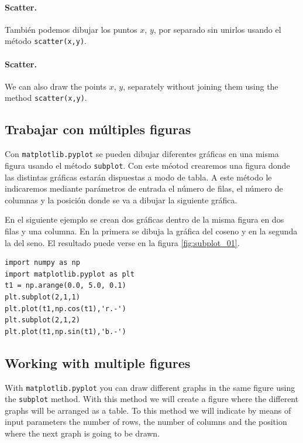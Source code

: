 \begin{paracol}{2}
    \paragraph{Scatter.} También podemos dibujar los puntos $x$, $y$, por separado sin unirlos usando el método \texttt{scatter(x,y)}. 
    \switchcolumn
    \paragraph{Scatter.} We can also draw the points $x$, $y$, separately without joining them using the method \texttt{scatter(x,y)}. 
\end{paracol}

\begin{paracol}{2}
\subsection{Trabajar con múltiples figuras}
Con \texttt{matplotlib.pyplot} se pueden dibujar diferentes gráficas en una misma figura usando el método \texttt{subplot}. Con este méotod crearemos una figura donde las distintas gráficas estarán dispuestas a modo de tabla. A este método le indicaremos mediante parámetros de entrada el número de filas, el número de columnas y la posición donde se va a dibujar la siguiente gráfica.

En el siguiente ejemplo se crean dos gráficas dentro de la misma figura en dos filas y una columna. En la primera se dibuja la gráfica del coseno y en la segunda la del seno. El resultado puede verse en la figura \ref{fig:subplot_01}.

\begin{verbatim}
import numpy as np
import matplotlib.pyplot as plt
t1 = np.arange(0.0, 5.0, 0.1)
plt.subplot(2,1,1)
plt.plot(t1,np.cos(t1),'r.-')
plt.subplot(2,1,2)
plt.plot(t1,np.sin(t1),'b.-')
\end{verbatim}

\switchcolumn

\subsection{Working with multiple figures}
With \texttt{matplotlib.pyplot} you can draw different graphs in the same figure using the \texttt{subplot} method. With this method we will create a figure where the different graphs will be arranged as a table. To this method we will indicate by means of input parameters the number of rows, the number of columns and the position where the next graph is going to be drawn.


\end{paracol}
